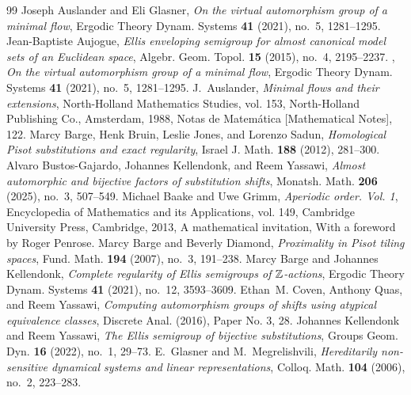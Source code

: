 \documentclass[10pt,a4paper]{amsart}
\numberwithin{equation}{section}
\begin{document}
\begin{thebibliography}{99}
 Joseph Auslander and Eli Glasner, \emph{On the virtual automorphism group of a minimal flow}, Ergodic Theory Dynam. Systems \textbf{41} (2021), no.~5, 1281--1295. 
 Jean-Baptiste Aujogue, \emph{Ellis enveloping semigroup for almost canonical model sets of an {E}uclidean space}, Algebr. Geom. Topol. \textbf{15} (2015), no.~4, 2195--2237. 
 \bysame, \emph{On the virtual automorphism group of a minimal flow}, Ergodic Theory Dynam. Systems \textbf{41} (2021), no.~5, 1281--1295. 
 J.~Auslander, \emph{Minimal flows and their extensions}, North-Holland Mathematics Studies, vol. 153, North-Holland Publishing Co., Amsterdam, 1988, Notas de Matem\'atica [Mathematical Notes], 122. 
 Marcy Barge, Henk Bruin, Leslie Jones, and Lorenzo Sadun, \emph{Homological {P}isot substitutions and exact regularity}, Israel J. Math. \textbf{188} (2012), 281--300. 
 Alvaro Bustos-Gajardo, Johannes Kellendonk, and Reem Yassawi, \emph{Almost automorphic and bijective factors of substitution shifts}, Monatsh. Math. \textbf{206} (2025), no.~3, 507--549. 
 Michael Baake and Uwe Grimm, \emph{Aperiodic order. {V}ol. 1}, Encyclopedia of Mathematics and its Applications, vol. 149, Cambridge University Press, Cambridge, 2013, A mathematical invitation, With a foreword by Roger Penrose. 
 Marcy Barge and Beverly Diamond, \emph{Proximality in {P}isot tiling spaces}, Fund. Math. \textbf{194} (2007), no.~3, 191--238. 
 Marcy Barge and Johannes Kellendonk, \emph{Complete regularity of {E}llis semigroups of {$\Bbb Z$}-actions}, Ergodic Theory Dynam. Systems \textbf{41} (2021), no.~12, 3593--3609. 
 Ethan~M. Coven, Anthony Quas, and Reem Yassawi, \emph{Computing automorphism groups of shifts using atypical equivalence classes}, Discrete Anal. (2016), Paper No. 3, 28. 
 Johannes Kellendonk and Reem Yassawi, \emph{The {E}llis semigroup of bijective substitutions}, Groups Geom. Dyn. \textbf{16} (2022), no.~1, 29--73. 
 E.~Glasner and M.~Megrelishvili, \emph{Hereditarily non-sensitive dynamical systems and linear representations}, Colloq. Math. \textbf{104} (2006), no.~2, 223--283. 

\end{thebibliography}
\end{document}
